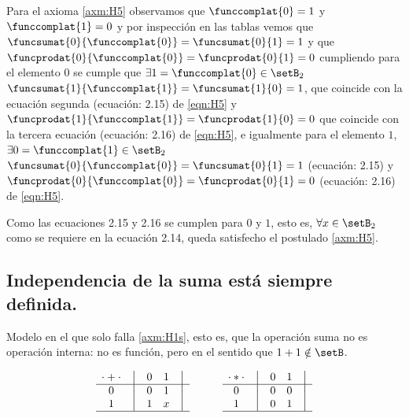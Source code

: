 	Para el axioma \ref{axm:H5} observamos que \(\funccomplat{0} = 1\) y
\(\funccomplat{1} = 0\) y por inspección en las tablas vemos que
\(\funcsumat{0}{\funccomplat{0}} = \funcsumat{0}{1} = 1\) y que
\(\funcprodat{0}{\funccomplat{0}} = \funcprodat{0}{1} = 0\) cumpliendo para
el elemento \(0\) se cumple que \(\exists 1 = \funccomplat{0} \in \setB_2 \)
\(\funcsumat{1}{\funccomplat{1}} = \funcsumat{1}{0} = 1\), que coincide con
la ecuación segunda (ecuación: 2.15) de \ref{eqn:H5} y
\(\funcprodat{1}{\funccomplat{1}}=\funcprodat{1}{0} = 0\) que coincide con la
tercera ecuación (ecuación: 2.16) de \ref{eqn:H5}, e igualmente para el
elemento \( 1 \), \(\exists 0 = \funccomplat{1} \in \setB_2 \) \(
\funcsumat{0}{\funccomplat{0}} = \funcsumat{0}{1} = 1\) (ecuación: 2.15) y
\(\funcprodat{0}{\funccomplat{0}} =\funcprodat{0}{1} = 0\) (ecuación: 2.16)
de \ref{eqn:H5}.




	Como las ecuaciones 2.15 y 2.16 se cumplen para \(0\) y \(1\), esto es,
\(\forall x \in \setB_2\) como se requiere en la ecuación 2.14, queda
satisfecho el postulado \ref{axm:H5}.



\subsection{Independencia de la suma está siempre definida.}



Modelo en el que solo falla \ref{axm:H1s}, esto es, que la operación suma
no es operación interna: no es función, pero en el sentido que \(1 + 1 \notin
\setB\).


\[
    \begin{matrix}
        {\cdot + \cdot} & \big{\vert} & {0} & {1} & \big{\vert} \\
        \hline
        {0}             & \big{\vert} & {0} & {1} & \big{\vert} \\
        {1}             & \big{\vert} & {1} & {x} & \big{\vert} \\
        \hline
    \end{matrix}
    \qquad\qquad
    \begin{matrix}
        {\cdot * \cdot} & \big{\vert} & {0} & {1} & \big{\vert} \\
        \hline
        {0}                   & \big{\vert} & {0} & {0} & \big{\vert} \\
        {1}                   & \big{\vert} & {0} & {1} & \big{\vert} \\
        \hline
    \end{matrix}
\]



